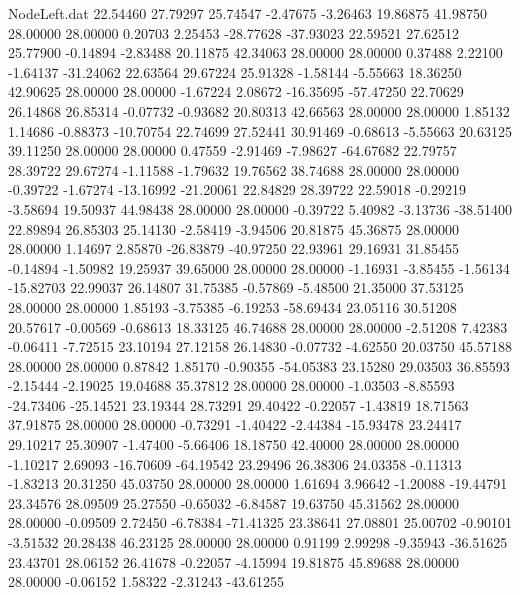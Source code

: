 \begin{filecontents}{NodeLeft.dat}
  22.54460   27.79297   25.74547    -2.47675   -3.26463   19.86875   41.98750   28.00000   28.00000    0.20703    2.25453  -28.77628  -37.93023
  22.59521   27.62512   25.77900    -0.14894   -2.83488   20.11875   42.34063   28.00000   28.00000    0.37488    2.22100   -1.64137  -31.24062
  22.63564   29.67224   25.91328    -1.58144   -5.55663   18.36250   42.90625   28.00000   28.00000   -1.67224    2.08672  -16.35695  -57.47250
  22.70629   26.14868   26.85314    -0.07732   -0.93682   20.80313   42.66563   28.00000   28.00000    1.85132    1.14686   -0.88373  -10.70754
  22.74699   27.52441   30.91469    -0.68613   -5.55663   20.63125   39.11250   28.00000   28.00000    0.47559   -2.91469   -7.98627  -64.67682
  22.79757   28.39722   29.67274    -1.11588   -1.79632   19.76562   38.74688   28.00000   28.00000   -0.39722   -1.67274  -13.16992  -21.20061
  22.84829   28.39722   22.59018    -0.29219   -3.58694   19.50937   44.98438   28.00000   28.00000   -0.39722    5.40982   -3.13736  -38.51400
  22.89894   26.85303   25.14130    -2.58419   -3.94506   20.81875   45.36875   28.00000   28.00000    1.14697    2.85870  -26.83879  -40.97250
  22.93961   29.16931   31.85455    -0.14894   -1.50982   19.25937   39.65000   28.00000   28.00000   -1.16931   -3.85455   -1.56134  -15.82703
  22.99037   26.14807   31.75385    -0.57869   -5.48500   21.35000   37.53125   28.00000   28.00000    1.85193   -3.75385   -6.19253  -58.69434
  23.05116   30.51208   20.57617    -0.00569   -0.68613   18.33125   46.74688   28.00000   28.00000   -2.51208    7.42383   -0.06411   -7.72515
  23.10194   27.12158   26.14830    -0.07732   -4.62550   20.03750   45.57188   28.00000   28.00000    0.87842    1.85170   -0.90355  -54.05383
  23.15280   29.03503   36.85593    -2.15444   -2.19025   19.04688   35.37812   28.00000   28.00000   -1.03503   -8.85593  -24.73406  -25.14521
  23.19344   28.73291   29.40422    -0.22057   -1.43819   18.71563   37.91875   28.00000   28.00000   -0.73291   -1.40422   -2.44384  -15.93478
  23.24417   29.10217   25.30907    -1.47400   -5.66406   18.18750   42.40000   28.00000   28.00000   -1.10217    2.69093  -16.70609  -64.19542
  23.29496   26.38306   24.03358    -0.11313   -1.83213   20.31250   45.03750   28.00000   28.00000    1.61694    3.96642   -1.20088  -19.44791
  23.34576   28.09509   25.27550    -0.65032   -6.84587   19.63750   45.31562   28.00000   28.00000   -0.09509    2.72450   -6.78384  -71.41325
  23.38641   27.08801   25.00702    -0.90101   -3.51532   20.28438   46.23125   28.00000   28.00000    0.91199    2.99298   -9.35943  -36.51625
  23.43701   28.06152   26.41678    -0.22057   -4.15994   19.81875   45.89688   28.00000   28.00000   -0.06152    1.58322   -2.31243  -43.61255

\end{filecontents}
